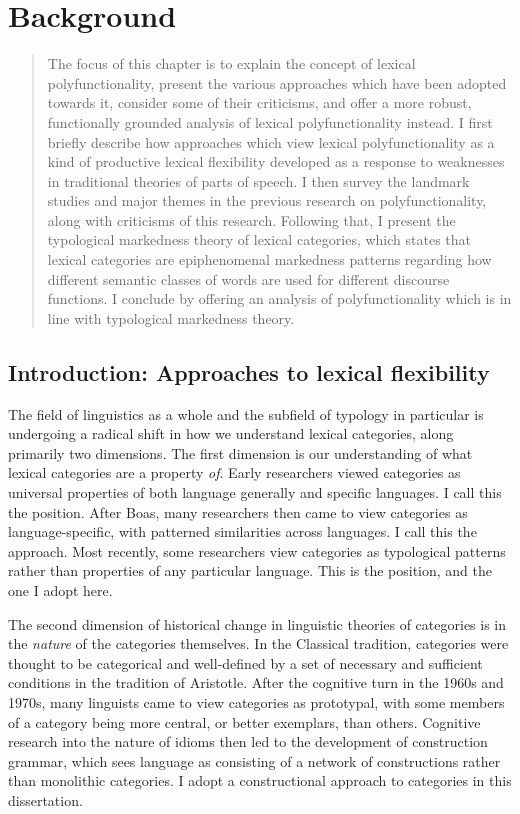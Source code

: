 \chapter{Background}
\label{ch:background}

\blockquote{The focus of this chapter is to explain the concept of lexical polyfunctionality, present the various approaches which have been adopted towards it, consider some of their criticisms, and offer a more robust, functionally grounded analysis of lexical polyfunctionality instead. I first briefly describe how approaches which view lexical polyfunctionality as a kind of productive lexical flexibility developed as a response to weaknesses in traditional theories of parts of speech. I then survey the landmark studies and major themes in the previous research on polyfunctionality, along with criticisms of this research. Following that, I present the typological markedness theory of lexical categories, which states that lexical categories are epiphenomenal markedness patterns regarding how different semantic classes of words are used for different discourse functions. I conclude by offering an analysis of polyfunctionality which is in line with typological markedness theory.}

\section{Introduction: Approaches to lexical flexibility}
\label{sec:2.1}

The field of linguistics as a whole and the subfield of typology in particular is undergoing a radical shift in how we understand lexical categories, along primarily two dimensions. The first dimension is our understanding of what lexical categories are a property \emph{of}. Early researchers viewed categories as universal properties of both language generally and specific languages. I call this the  position. After Boas, many researchers then came to view categories as language-specific, with patterned similarities across languages. I call this the  approach. Most recently, some researchers view categories as typological patterns rather than properties of any particular language. This is the  position, and the one I adopt here.

The second dimension of historical change in linguistic theories of categories is in the \emph{nature} of the categories themselves. In the Classical tradition, categories were thought to be categorical and well-defined by a set of necessary and sufficient conditions in the tradition of Aristotle. After the cognitive turn in the 1960s and 1970s, many linguists came to view categories as prototypal, with some members of a category being more central, or better exemplars, than others. Cognitive research into the nature of idioms then led to the development of construction grammar, which sees language as consisting of a network of constructions rather than monolithic categories. I adopt a constructional approach to categories in this dissertation.

